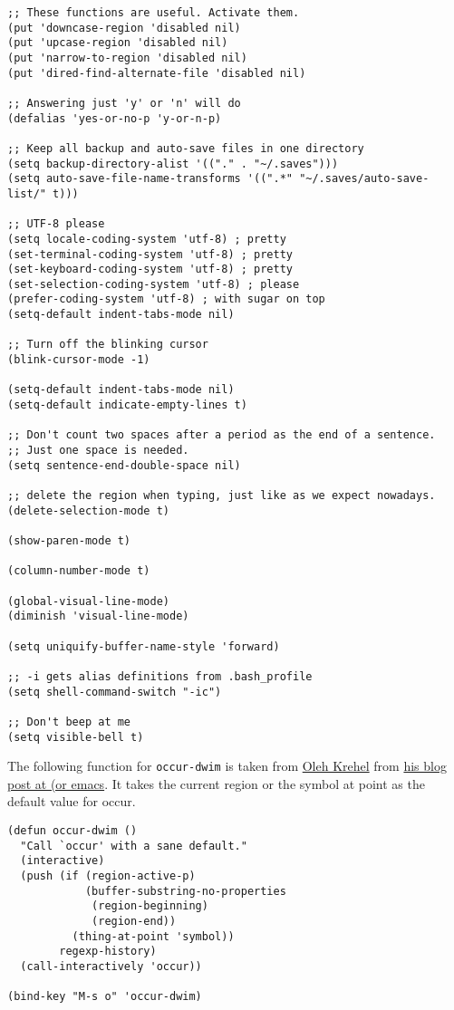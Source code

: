 \documentclass[11pt]{article}
\begin{document}
\begin{verbatim}
;; These functions are useful. Activate them.
(put 'downcase-region 'disabled nil)
(put 'upcase-region 'disabled nil)
(put 'narrow-to-region 'disabled nil)
(put 'dired-find-alternate-file 'disabled nil)

;; Answering just 'y' or 'n' will do
(defalias 'yes-or-no-p 'y-or-n-p)

;; Keep all backup and auto-save files in one directory
(setq backup-directory-alist '(("." . "~/.saves")))
(setq auto-save-file-name-transforms '((".*" "~/.saves/auto-save-list/" t)))

;; UTF-8 please
(setq locale-coding-system 'utf-8) ; pretty
(set-terminal-coding-system 'utf-8) ; pretty
(set-keyboard-coding-system 'utf-8) ; pretty
(set-selection-coding-system 'utf-8) ; please
(prefer-coding-system 'utf-8) ; with sugar on top
(setq-default indent-tabs-mode nil)

;; Turn off the blinking cursor
(blink-cursor-mode -1)

(setq-default indent-tabs-mode nil)
(setq-default indicate-empty-lines t)

;; Don't count two spaces after a period as the end of a sentence.
;; Just one space is needed.
(setq sentence-end-double-space nil)

;; delete the region when typing, just like as we expect nowadays.
(delete-selection-mode t)

(show-paren-mode t)

(column-number-mode t)

(global-visual-line-mode)
(diminish 'visual-line-mode)

(setq uniquify-buffer-name-style 'forward)

;; -i gets alias definitions from .bash_profile
(setq shell-command-switch "-ic")

;; Don't beep at me
(setq visible-bell t)
\end{verbatim}

The following function for \verb~occur-dwim~ is taken from \href{https://github.com/abo-abo}{Oleh Krehel} from
\href{http://oremacs.com/2015/01/26/occur-dwim/}{his blog post at (or emacs}. It takes the current region or the symbol
at point as the default value for occur.

\begin{verbatim}
(defun occur-dwim ()
  "Call `occur' with a sane default."
  (interactive)
  (push (if (region-active-p)
            (buffer-substring-no-properties
             (region-beginning)
             (region-end))
          (thing-at-point 'symbol))
        regexp-history)
  (call-interactively 'occur))

(bind-key "M-s o" 'occur-dwim)
\end{verbatim}
\end{document}

